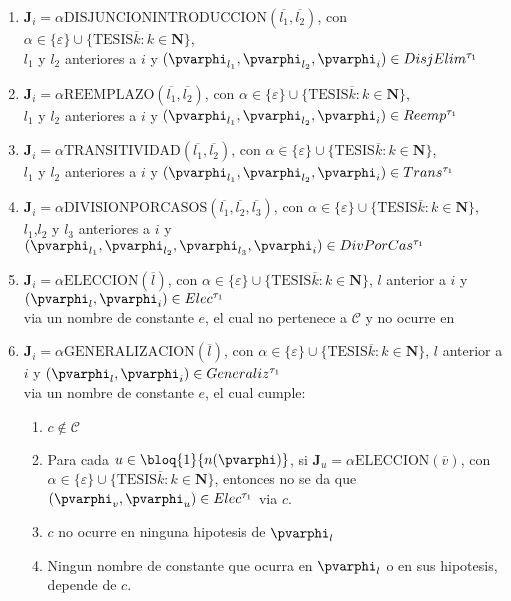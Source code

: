 \begin{definition}
\begin{enumerate}
\begin{enumerate}
      \item $\mathbf{J}_i=\alpha\text{DISJUNCIONINTRODUCCION}(\overline{l_1},\overline{l_2})$, con $\alpha\in\{\varepsilon\}\cup\{\text{TESIS}\overline{k}:k\in\mathbf{N}\}$, \\$l_1$ y $l_2$ anteriores a $i$ y $(\pvarphi_{l_1},\pvarphi_{l_2},\pvarphi_i)\in DisjElim^{\tau_1}$    
      \item $\mathbf{J}_i=\alpha\text{REEMPLAZO}(\overline{l_1},\overline{l_2})$, con $\alpha\in\{\varepsilon\}\cup\{\text{TESIS}\overline{k}:k\in\mathbf{N}\}$, \\$l_1$ y $l_2$ anteriores a $i$ y $(\pvarphi_{l_1},\pvarphi_{l_2},\pvarphi_i)\in Reemp^{\tau_1}$    
      \item $\mathbf{J}_i=\alpha\text{TRANSITIVIDAD}(\overline{l_1},\overline{l_2})$, con $\alpha\in\{\varepsilon\}\cup\{\text{TESIS}\overline{k}:k\in\mathbf{N}\}$, \\$l_1$ y $l_2$ anteriores a $i$ y $(\pvarphi_{l_1},\pvarphi_{l_2},\pvarphi_i)\in Trans^{\tau_1}$    
      \item $\mathbf{J}_i=\alpha\text{DIVISIONPORCASOS}(\overline{l_1},\overline{l_2},\overline{l_3})$, con $\alpha\in\{\varepsilon\}\cup\{\text{TESIS}\overline{k}:k\in\mathbf{N}\}$, \\$l_1$,$l_2$ y $l_3$ anteriores a $i$ y $(\pvarphi_{l_1},\pvarphi_{l_2},\pvarphi_{l_3},\pvarphi_i)\in DivPorCas^{\tau_1}$
      \item $\mathbf{J}_i=\alpha\text{ELECCION}(\overline{l})$, con $\alpha\in\{\varepsilon\}\cup\{\text{TESIS}\overline{k}:k\in\mathbf{N}\}$, $l$ anterior a $i$ y $(\pvarphi_{l},\pvarphi_i)\in Elec^{\tau_1}$\\ via un nombre de constante $e$, el cual no pertenece a $\mathcal{C}$ y no ocurre en 
      \item $\mathbf{J}_i=\alpha\text{GENERALIZACION}(\overline{l})$, con $\alpha\in\{\varepsilon\}\cup\{\text{TESIS}\overline{k}:k\in\mathbf{N}\}$, $l$ anterior a $i$ y $(\pvarphi_{l},\pvarphi_i)\in Generaliz^{\tau_1}$\\ via un nombre de constante $e$, el cual cumple:\begin{enumerate}
        \item $c\not\in\mathcal{C}$
        \item Para cada $u \in \bloq{1}{n(\pvarphi)}$, si $\mathbf{J}_u=\alpha\text{ELECCION}(\overline{v})$, con $\alpha\in\{\varepsilon\}\cup\{\text{TESIS}\overline{k}:k\in\mathbf{N}\}$, entonces no se da que $(\pvarphi_v,\pvarphi_u)\in Elec^{\tau_1}$ via $c$.
        \item $c$ no ocurre en ninguna hipotesis de $\pvarphi_l$
        \item Ningun nombre de constante que ocurra en $\pvarphi_l$ o en sus hipotesis, depende de $c$.
      \end{enumerate}
    \end{enumerate}
  \end{enumerate}
\end{definition}

